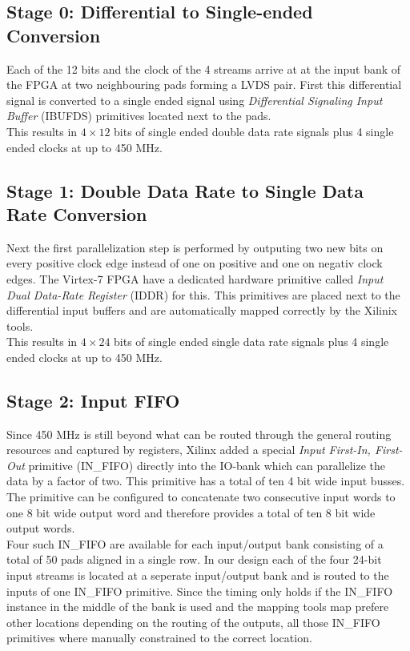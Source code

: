 \subsection{Stage 0: Differential to Single-ended Conversion}
Each of the 12 bits and the clock of the 4 streams arrive at at the input bank
of the \gls{FPGA} at two neighbouring pads forming a \gls{LVDS} pair.
First this differential signal is converted to a single ended signal using
{\em Differential Signaling Input Buffer} (IBUFDS) primitives located next
to the pads. \\

This results in $4 \times 12$ bits of single ended double data rate
signals plus 4 single ended clocks at up to 450 MHz. \\

\subsection{Stage 1: Double Data Rate to Single Data Rate Conversion}
\label{sec:fpga_adc_s1}
Next the first parallelization step is performed by outputing two new
bits on every positive clock edge instead of one on positive and one on negativ
clock edges. The Virtex-7 \gls{FPGA} have a dedicated hardware primitive
called {\em Input Dual Data-Rate Register} (IDDR) for this.
This primitives are placed next to the differential input buffers
and are automatically mapped correctly by the Xilinix tools. \\

This results in $4 \times 24$ bits of single ended single data rate
signals plus 4 single ended clocks at up to 450 MHz. \\

\subsection{Stage 2: Input FIFO}
Since 450 MHz is still beyond what can be routed through the general
routing resources and captured by registers, Xilinx added a special
{\em Input First-In, First-Out} primitive (IN\_FIFO)
directly into the IO-bank which can parallelize the data by a factor of two.
This primitive has a total of ten 4 bit wide input busses.
The primitive can be configured to concatenate two consecutive input words
to one 8 bit wide output word and therefore provides a total of
ten 8 bit wide output words. \\

Four such IN\_FIFO are available for each
input/output bank consisting of a total of 50 pads aligned in a single row.
In our design each of the four 24-bit input streams is located at a seperate
input/output bank and is routed to the inputs of one IN\_FIFO primitive.
Since the timing only holds if the IN\_FIFO instance in the middle of the bank
is used and the mapping tools map prefere other locations depending on the
routing of the outputs, all those IN\_FIFO primitives where manually constrained
to the correct location. \\


